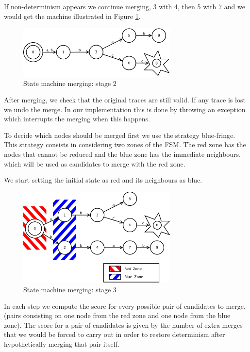 \documentclass[]{sigplanconf}
\begin{document}
If non-determinism appears we continue merging, 3 with 4, then
5 with 7 and we would get the machine illustrated in Figure \ref{fsm3}.

\begin{figure}
\begin{center}
\includegraphics[width=8cm]{pictures/fsm3.pdf}
\end{center}
\caption{State machine merging: stage 2}
\label{fsm3}
\end{figure}

After merging, we check that the original traces are still
valid. If any trace is lost we undo the merge. In our implementation
this is done by throwing an exception which interrupts the merging
when this happens.

To decide which nodes should be merged first we use the strategy
blue-fringe. This strategy consists in considering two zones of the
FSM. The red zone has the nodes that cannot be reduced
and the blue zone has the immediate neighbours, which will
be used as candidates to merge with the red zone.

We start setting the initial state as red and its neighbours as blue.

\begin{figure}
\begin{center}
\includegraphics[width=8cm]{pictures/fsm4.pdf}
\end{center}
\caption{State machine merging: stage 3}
\label{fsm4}
\end{figure}

In each step we compute the score for every possible pair of candidates
to merge, (pairs consisting on one node from the red zone and one node from the blue zone).
The score for a pair of candidates is given by the number of extra
merges that we would be forced to carry out in order to restore determinism after
hypothetically merging that pair itself.
\end{document}
